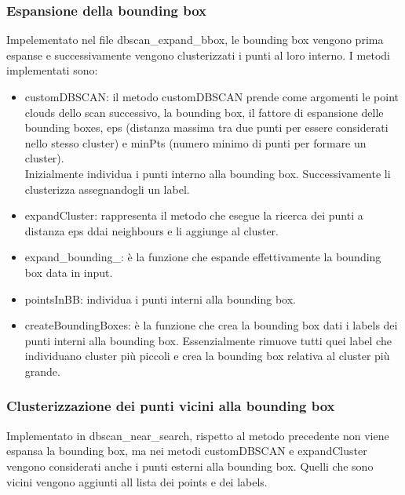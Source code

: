 \documentclass[italian]{article}
\begin{document}
\begin{itemiz}
\subsubsection{Espansione della bounding box}
Impelementato nel file dbscan\_expand\_bbox, le bounding box vengono prima espanse e successivamente vengono clusterizzati i punti al loro interno.
I metodi implementati sono:
\begin{itemize}
	\item customDBSCAN: il metodo customDBSCAN prende come argomenti le point clouds dello scan successivo, la bounding box, il fattore di espansione delle bounding boxes, eps (distanza massima tra due punti per essere considerati nello stesso cluster) e minPts (numero minimo di punti per formare un cluster).\\ Inizialmente individua i punti interno alla bounding box. Successivamente li clusterizza assegnandogli un label.
	\item expandCluster: rappresenta il metodo che esegue la ricerca dei punti a distanza eps ddai neighbours e li aggiunge al cluster.
	\item expand\_bounding\_: è la funzione che espande effettivamente la bounding box data in input.
	\item pointsInBB: individua i punti interni alla bounding box.
	\item createBoundingBoxes: è la funzione che crea la bounding box dati i labels dei punti interni alla bounding box. Essenzialmente rimuove tutti quei label che individuano cluster più piccoli e crea la bounding box relativa al cluster più grande.
\end{itemize}
\subsubsection{Clusterizzazione dei punti vicini alla bounding box}
Implementato in dbscan\_near\_search, rispetto al metodo precedente non viene espansa la bounding box, ma nei metodi customDBSCAN e expandCluster vengono considerati anche i punti esterni alla bounding box. Quelli che sono vicini vengono aggiunti all lista dei points e dei labels.

\end{itemiz}
\end{document}
